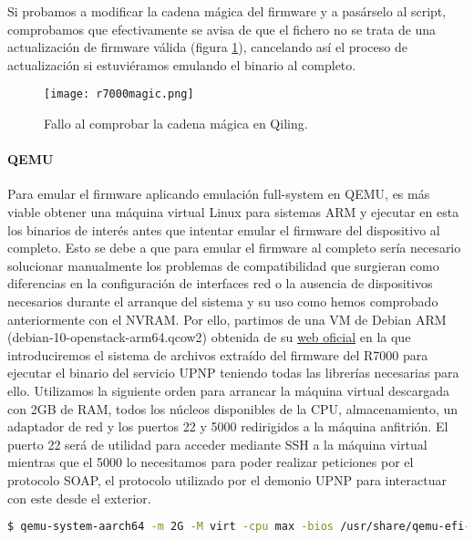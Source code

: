 Si probamos a modificar la cadena mágica del firmware y a pasárselo al script, comprobamos que efectivamente se avisa de que 
el fichero no se trata de una actualización de firmware válida (figura \ref{fig:R7000magic}), cancelando así el proceso de actualización si estuviéramos 
emulando el binario al completo.

\begin{figure}[H]
    \centering
    \texttt{[image: r7000magic.png]}
    \caption{Fallo al comprobar la cadena mágica en Qiling.}
    \label{fig:R7000magic}
\end{figure}

\paragraph{QEMU}
Para emular el firmware aplicando emulación full-system en QEMU, es más viable obtener una máquina virtual Linux para sistemas ARM 
y ejecutar en esta los binarios de interés antes que intentar emular el firmware del dispositivo al completo. Esto se debe a que para emular el firmware al completo sería necesario solucionar manualmente los problemas de compatibilidad que surgieran como diferencias en la configuración 
de interfaces red o la ausencia de dispositivos necesarios durante el arranque del sistema y su uso como hemos comprobado anteriormente 
con el NVRAM. Por ello, partimos de una VM de Debian ARM (debian-10-openstack-arm64.qcow2) obtenida de su  
\href{https://cdimage.debian.org/cdimage/cloud/OpenStack/}{web oficial} en la que introduciremos el sistema de archivos extraído del firmware 
del R7000 para ejecutar el binario del servicio UPNP teniendo todas las librerías necesarias para ello. Utilizamos la siguiente 
orden para arrancar la máquina virtual descargada con 2GB de RAM, todos los núcleos disponibles de la CPU, almacenamiento, un 
adaptador de red y los puertos 22 y 5000 redirigidos a la máquina anfitrión. El puerto 22 será de utilidad para acceder 
mediante SSH a la máquina virtual mientras que el 5000 lo necesitamos para poder realizar peticiones por el protocolo SOAP, el protocolo utilizado por el demonio UPNP para interactuar con este desde el exterior.

\begin{lstlisting}[language=bash, breaklines]
    $ qemu-system-aarch64 -m 2G -M virt -cpu max -bios /usr/share/qemu-efi-aarch64/QEMU_EFI.fd -drive if=none,file=debian-10-openstack-arm64.qcow2,id=hd0 -device virtio-blk-device,drive=hd0 -device e1000,netdev=net0 -netdev user,id=net0,hostfwd=tcp:127.0.0.1:1234-:22,hostfwd=tcp::5000-:5000 -nographic
\end{lstlisting}

